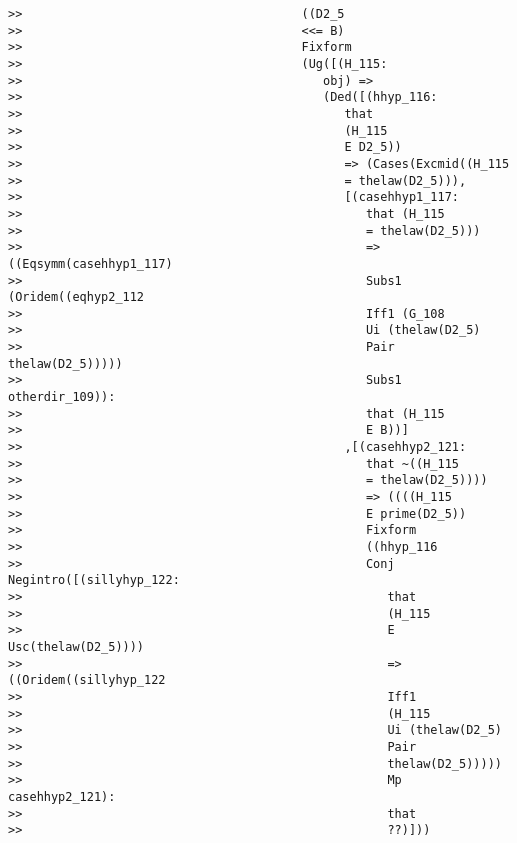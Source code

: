 \documentclass[12pt]{article}
\begin{document}
\begin{verbatim}
>>                                       ((D2_5
>>                                       <<= B)
>>                                       Fixform
>>                                       (Ug([(H_115:
>>                                          obj) =>
>>                                          (Ded([(hhyp_116:
>>                                             that
>>                                             (H_115
>>                                             E D2_5))
>>                                             => (Cases(Excmid((H_115
>>                                             = thelaw(D2_5))),
>>                                             [(casehhyp1_117:
>>                                                that (H_115
>>                                                = thelaw(D2_5)))
>>                                                => ((Eqsymm(casehhyp1_117)
>>                                                Subs1 (Oridem((eqhyp2_112
>>                                                Iff1 (G_108
>>                                                Ui (thelaw(D2_5)
>>                                                Pair thelaw(D2_5)))))
>>                                                Subs1 otherdir_109)):
>>                                                that (H_115
>>                                                E B))]
>>                                             ,[(casehhyp2_121:
>>                                                that ~((H_115
>>                                                = thelaw(D2_5))))
>>                                                => ((((H_115
>>                                                E prime(D2_5))
>>                                                Fixform
>>                                                ((hhyp_116
>>                                                Conj Negintro([(sillyhyp_122:
>>                                                   that
>>                                                   (H_115
>>                                                   E Usc(thelaw(D2_5))))
>>                                                   => ((Oridem((sillyhyp_122
>>                                                   Iff1
>>                                                   (H_115
>>                                                   Ui (thelaw(D2_5)
>>                                                   Pair
>>                                                   thelaw(D2_5)))))
>>                                                   Mp casehhyp2_121):
>>                                                   that
>>                                                   ??)]))

\end{verbatim}
\end{document}
